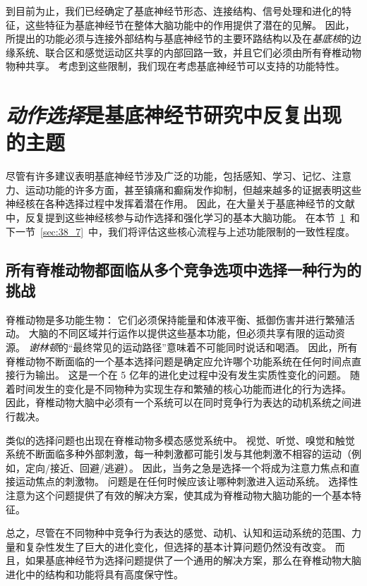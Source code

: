 到目前为止，我们已经确定了基底神经节形态、连接结构、信号处理和进化的特征，这些特征为基底神经节在整体大脑功能中的作用提供了潜在的见解。
因此，所提出的功能必须与连接外部结构与基底神经节的主要环路结构以及在\textit{基底核}的边缘系统、联合区和感觉运动区共享的内部回路一致，并且它们必须由所有脊椎动物物种共享。
考虑到这些限制，我们现在考虑基底神经节可以支持的功能特性。



\section{\textit{动作选择}是基底神经节研究中反复出现的主题} \label{sec:38_6}

尽管有许多建议表明基底神经节涉及广泛的功能，包括感知、学习、记忆、注意力、运动功能的许多方面，甚至镇痛和癫痫发作抑制，但越来越多的证据表明这些神经核在各种选择过程中发挥着潜在作用。
因此，在大量关于基底神经节的文献中，反复提到这些神经核参与动作选择和强化学习的基本大脑功能。
在本节~\ref{sec:38_6}~和下一节~\ref{sec:38_7}~中，我们将评估这些核心流程与上述功能限制的一致性程度。



\subsection{所有脊椎动物都面临从多个竞争选项中选择一种行为的挑战}

脊椎动物是多功能生物：
它们必须保持能量和体液平衡、抵御伤害并进行繁殖活动。
大脑的不同区域并行运作以提供这些基本功能，但必须共享有限的运动资源。
\textit{谢林顿}的“最终常见的运动路径”意味着不可能同时说话和喝酒。
因此，所有脊椎动物不断面临的一个基本选择问题是确定应允许哪个功能系统在任何时间点直接行为输出。
这是一个在 5 亿年的进化史过程中没有发生实质性变化的问题。
随着时间发生的变化是不同物种为实现生存和繁殖的核心功能而进化的行为选择。
因此，脊椎动物大脑中必须有一个系统可以在同时竞争行为表达的动机系统之间进行裁决。


类似的选择问题也出现在脊椎动物多模态感觉系统中。
视觉、听觉、嗅觉和触觉系统不断面临多种外部刺激，每一种刺激都可能引发与其他刺激不相容的运动（例如，定向/接近、回避/逃避）。
因此，当务之急是选择一个将成为注意力焦点和直接运动焦点的刺激物。
问题是在任何时候应该让哪种刺激进入运动系统。
选择性注意为这个问题提供了有效的解决方案，使其成为脊椎动物大脑功能的一个基本特征。


总之，尽管在不同物种中竞争行为表达的感觉、动机、认知和运动系统的范围、力量和复杂性发生了巨大的进化变化，但选择的基本计算问题仍然没有改变。
而且，如果基底神经节为选择问题提供了一个通用的解决方案，那么在脊椎动物大脑进化中的结构和功能将具有高度保守性。



